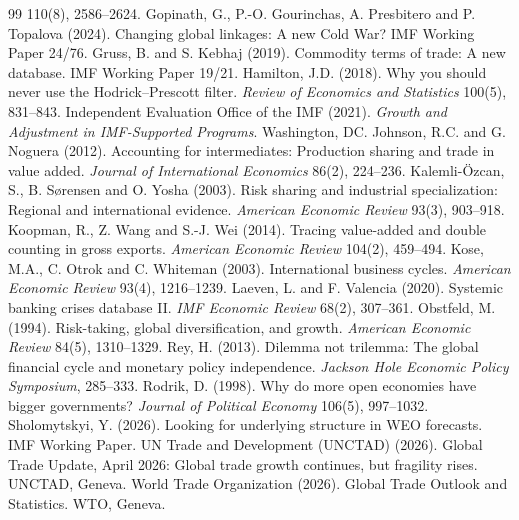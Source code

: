 \documentclass[12pt, a4paper]{article}
\begin{document}
\begin{thebibliography}{99}
110(8), 2586--2624.
 Gopinath, G., P.-O. Gourinchas, A. Presbitero and
P. Topalova (2024). Changing global linkages: A new Cold War? IMF Working Paper 24/76.
 Gruss, B. and S. Kebhaj (2019). Commodity terms of
trade: A new database. IMF Working Paper 19/21.
 Hamilton, J.D. (2018). Why you should never use the Hodrick--Prescott filter. \textit{Review of Economics and Statistics} 100(5), 831--843.
 Independent Evaluation Office of the IMF (2021). \textit{Growth and
Adjustment in IMF-Supported Programs}. Washington, DC.
 Johnson, R.C. and G. Noguera (2012). Accounting for intermediates: Production sharing and trade in value added. \textit{Journal of International Economics} 86(2), 224--236.
 Kalemli-\"Ozcan, S., B. S{\o}rensen and
O. Yosha (2003). Risk sharing and industrial specialization: Regional and international evidence.
\textit{American Economic Review} 93(3), 903--918.
 Koopman, R., Z. Wang and S.-J. Wei (2014). Tracing value-added and double counting in gross exports. \textit{American Economic Review} 104(2), 459--494.
 Kose, M.A., C. Otrok and C. Whiteman (2003). International
business cycles. \textit{American Economic Review} 93(4), 1216--1239.
 Laeven, L. and F. Valencia (2020). Systemic banking crises database II. \textit{IMF Economic Review} 68(2), 307--361.
 Obstfeld, M. (1994). Risk-taking, global diversification, and
growth. \textit{American Economic Review} 84(5), 1310--1329.
 Rey, H. (2013). Dilemma not trilemma: The global financial cycle
and monetary policy independence. \textit{Jackson Hole Economic Policy Symposium}, 285--333.
 Rodrik, D. (1998). Why do more open economies have bigger
governments? \textit{Journal of Political Economy} 106(5), 997--1032.
 Sholomytskyi, Y. (2026). Looking for underlying
structure in WEO forecasts. IMF Working Paper.
 UN Trade and Development (UNCTAD) (2026). Global Trade Update, April
2026: Global trade growth continues, but fragility rises. UNCTAD, Geneva.
 World Trade Organization (2026). Global Trade Outlook and
Statistics. WTO, Geneva.
\end{thebibliography}
\end{document}
